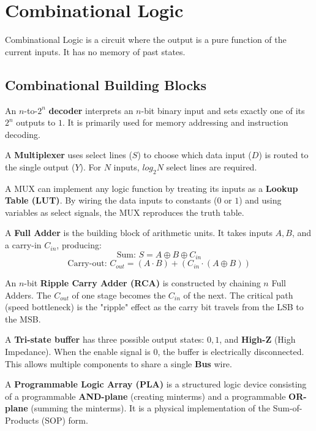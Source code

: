
\section{Combinational Logic}

\begin{definition}
Combinational Logic is a circuit where the output is a pure function of the current inputs. It has no memory of past states.
\end{definition}

\subsection{Combinational Building Blocks}

\begin{definition}
An $n$-to-$2^n$ \textbf{decoder} interprets an $n$-bit binary input and sets exactly one of its $2^n$ outputs to $1$. It is primarily used for memory addressing and instruction decoding.
\end{definition}

\begin{definition}
A \textbf{Multiplexer} uses select lines ($S$) to choose which data input ($D$) is routed to the single output ($Y$). For $N$ inputs, $log_2 N$ select lines are required.
\end{definition}

\begin{example}
A MUX can implement any logic function by treating its inputs as a \textbf{Lookup Table (LUT)}. By wiring the data inputs to constants ($0$ or $1$) and using variables as select signals, the MUX reproduces the truth table.
\end{example}

\begin{definition}
A \textbf{Full Adder} is the building block of arithmetic units. It takes inputs $A, B$, and a carry-in $C_{in}$, producing:
$$\text{Sum: } S = A \oplus B \oplus C_{in}$$
$$\text{Carry-out: } C_{out} = (A \cdot B) + (C_{in} \cdot (A \oplus B))$$
\end{definition}

\begin{important}
An $n$-bit \textbf{Ripple Carry Adder (RCA)} is constructed by chaining $n$ Full Adders. The $C_{out}$ of one stage becomes the $C_{in}$ of the next. The critical path (speed bottleneck) is the "ripple" effect as the carry bit travels from the LSB to the MSB.
\end{important}

\begin{lemma}
A \textbf{Tri-state buffer} has three possible output states: $0, 1$, and \textbf{High-Z} (High Impedance). When the enable signal is $0$, the buffer is electrically disconnected. This allows multiple components to share a single \textbf{Bus} wire.
\end{lemma}

\begin{example}
A \textbf{Programmable Logic Array (PLA)} is a structured logic device consisting of a programmable \textbf{AND-plane} (creating minterms) and a programmable \textbf{OR-plane} (summing the minterms). It is a physical implementation of the Sum-of-Products (SOP) form.
\end{example}